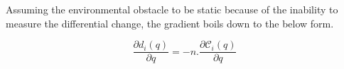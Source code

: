 Assuming the environmental obstacle to be static because of the inability to measure the differential change, the gradient boils down to the below form.

\begin{equation} \label{eq:proxdiff} 
\frac{\partial d_i(q) }{\partial q} = -n.\frac{\partial \mathcal{C}_{i}(q) }{\partial q}
\end{equation}

 















